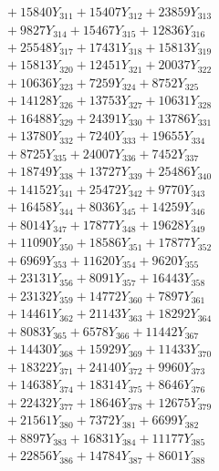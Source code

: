 \documentclass[a4paper,10pt]{article}
\begin{document}
{\begin{align}
&\;  + 15840 Y_{311} + 15407 Y_{312} + 23859 Y_{313} \\[0.3ex]
&\;  + 9827 Y_{314} + 15467 Y_{315} + 12836 Y_{316} \\[0.3ex]
&\;  + 25548 Y_{317} + 17431 Y_{318} + 15813 Y_{319} \\[0.3ex]
&\;  + 15813 Y_{320} + 12451 Y_{321} + 20037 Y_{322} \\[0.3ex]
&\;  + 10636 Y_{323} + 7259 Y_{324} + 8752 Y_{325} \\[0.3ex]
&\;  + 14128 Y_{326} + 13753 Y_{327} + 10631 Y_{328} \\[0.5ex]\allowbreak
&\;  + 16488 Y_{329} + 24391 Y_{330} + 13786 Y_{331} \\[0.3ex]
&\;  + 13780 Y_{332} + 7240 Y_{333} + 19655 Y_{334} \\[0.3ex]
&\;  + 8725 Y_{335} + 24007 Y_{336} + 7452 Y_{337} \\[0.3ex]
&\;  + 18749 Y_{338} + 13727 Y_{339} + 25486 Y_{340} \\[0.3ex]
&\;  + 14152 Y_{341} + 25472 Y_{342} + 9770 Y_{343} \\[0.3ex]
&\;  + 16458 Y_{344} + 8036 Y_{345} + 14259 Y_{346} \\[0.3ex]
&\;  + 8014 Y_{347} + 17877 Y_{348} + 19628 Y_{349} \\[0.3ex]
&\;  + 11090 Y_{350} + 18586 Y_{351} + 17877 Y_{352} \\[0.3ex]
&\;  + 6969 Y_{353} + 11620 Y_{354} + 9620 Y_{355} \\[0.3ex]
&\;  + 23131 Y_{356} + 8091 Y_{357} + 16443 Y_{358} \\[0.5ex]\allowbreak
&\;  + 23132 Y_{359} + 14772 Y_{360} + 7897 Y_{361} \\[0.3ex]
&\;  + 14461 Y_{362} + 21143 Y_{363} + 18292 Y_{364} \\[0.3ex]
&\;  + 8083 Y_{365} + 6578 Y_{366} + 11442 Y_{367} \\[0.3ex]
&\;  + 14430 Y_{368} + 15929 Y_{369} + 11433 Y_{370} \\[0.3ex]
&\;  + 18322 Y_{371} + 24140 Y_{372} + 9960 Y_{373} \\[0.3ex]
&\;  + 14638 Y_{374} + 18314 Y_{375} + 8646 Y_{376} \\[0.3ex]
&\;  + 22432 Y_{377} + 18646 Y_{378} + 12675 Y_{379} \\[0.3ex]
&\;  + 21561 Y_{380} + 7372 Y_{381} + 6699 Y_{382} \\[0.3ex]
&\;  + 8897 Y_{383} + 16831 Y_{384} + 11177 Y_{385} \\[0.3ex]
&\;  + 22856 Y_{386} + 14784 Y_{387} + 8601 Y_{388} \\[0.5ex]\allowbreak

\end{align}}
\end{document}
